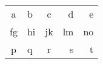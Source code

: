 \begin{center}
\begin{tabular}{clcr|r|}
  a & b & c & d & e\\
  fg & hi & jk & lm & no\\
  \hline
  p & q & r & s & t
\end{tabular}
\end{center}

